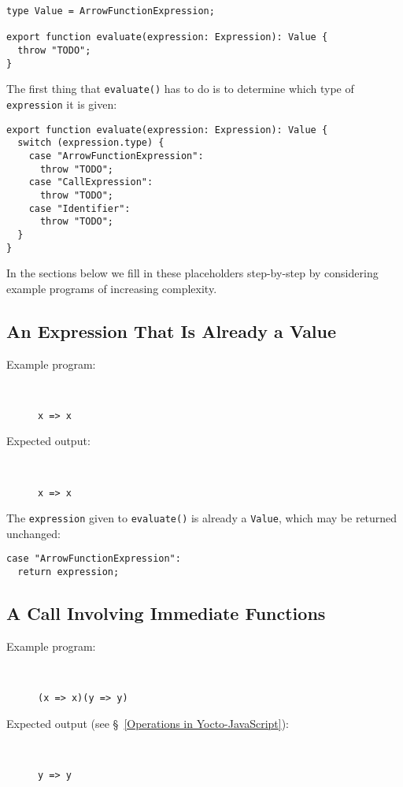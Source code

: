 \documentclass[12pt, oneside]{book}
\begin{document}
\begin{verbatim}
type Value = ArrowFunctionExpression;

export function evaluate(expression: Expression): Value {
  throw "TODO";
}
\end{verbatim}

The first thing that \texttt{evaluate()} has to do is to determine which type of \texttt{expression} it is given:

\begin{verbatim}
export function evaluate(expression: Expression): Value {
  switch (expression.type) {
    case "ArrowFunctionExpression":
      throw "TODO";
    case "CallExpression":
      throw "TODO";
    case "Identifier":
      throw "TODO";
  }
}
\end{verbatim}

In the sections below we fill in these placeholders step-by-step by considering example programs of increasing complexity.

\subsection{An Expression That Is Already a Value}

\begin{description}
\item [Example program:] ~

\begin{verbatim}
x => x
\end{verbatim}

\item [Expected output:] ~

\begin{verbatim}
x => x
\end{verbatim}
\end{description}

The \texttt{expression} given to \texttt{evaluate()} is already a \texttt{Value}, which may be returned unchanged:

\begin{verbatim}
case "ArrowFunctionExpression":
  return expression;
\end{verbatim}

\subsection{A Call Involving Immediate Functions}

\begin{description}
\item [Example program:] ~

\begin{verbatim}
(x => x)(y => y)
\end{verbatim}

\item [Expected output (see §~\ref{Operations in Yocto-JavaScript}):] ~

\begin{verbatim}
y => y
\end{verbatim}
\end{description}
\end{document}
